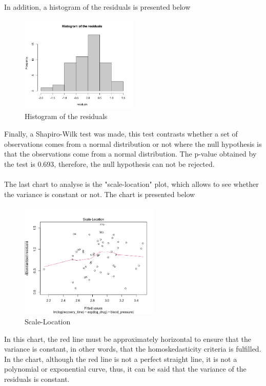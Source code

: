 \documentclass{article}
\begin{document}
In addition, a histogram of the residuals is presented below

\begin{figure}[H]
\centering
\includegraphics[width=0.5\textwidth]{hr.png}
\caption{\label{fig:frogg} Histogram of the residuals }
\end{figure}

Finally, a Shapiro-Wilk test was made, this test contrasts whether a set of observations comes from a normal distribution or not where the null hypothesis is that the observations come from a normal distribution. The p-value obtained by the test is 0.693, therefore, the null hypothesis can not be rejected. \\
\\
The last chart to analyse is the "scale-location" plot, which allows to see whether the variance is constant or not. The chart is presented below

\begin{figure}[H]
\centering
\includegraphics[width=0.6\textwidth]{sl.png}
\caption{\label{fig:frogg} Scale-Location}
\end{figure}
In this chart, the red line must be approximately horizontal to ensure that the variance is constant, in other words, that the homoskedasticity criteria is fulfilled. In the chart, although the red line is not a perfect straight line, it is not a polynomial or exponential curve, thus, it can be said that the variance of the residuals is constant. 
\end{document}
